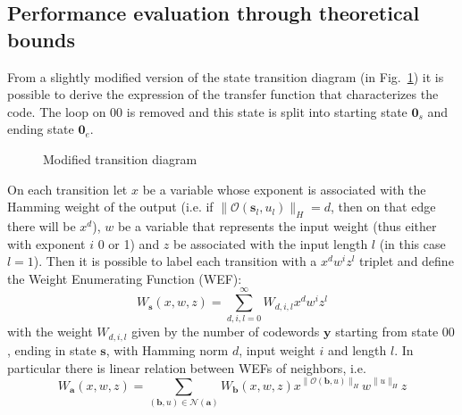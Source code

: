 \documentclass[10pt]{article}
\newcommand{\outf}[1] {\mathcal{O}(#1)}
\newcommand{\s} {\mathbf{s}}
\begin{document}
\subsection{Performance evaluation through theoretical bounds}

From a slightly modified version of the state transition diagram (in Fig.~\ref{fig:state_t}) it is possible to derive the expression of the transfer function that characterizes the code. The loop on $00$ is removed and this state is split into starting state $\mathbf{0}_s$ and ending state $\mathbf{0}_e$.

\begin{figure}
\centering
{}
\caption{Modified transition diagram}
\label{fig:state_t}
\end{figure}

On each transition let $x$ be a variable whose exponent is associated with the Hamming weight of the output (i.e. if $\|\outf{\s_l, u_l}\|_H = d$, then on that edge there will be $x^d$), $w$ be a variable that represents the input weight (thus either with exponent $i$ 0 or 1) and $z$ be associated with the input length $l$ (in this case $l=1$). Then it is possible to label each transition with a $x^dw^iz^l$ triplet and define the Weight Enumerating Function (WEF):
\begin{equation}
	W_{\mathbf{s}}(x, w, z) = \sum_{d, i, l = 0}^{\infty}W_{d, i, l} x^dw^iz^l
\end{equation}
with the weight $W_{d, i, l}$ given by the number of codewords $\mathbf{y}$ starting from state $00$, ending in state $\mathbf{s}$, with Hamming norm $d$, input weight $i$ and length $l$. In particular there is linear relation between WEFs of neighbors, i.e.
\begin{equation}
	W_{\mathbf{a}}(x, w, z) = \sum_{(\mathbf{b}, u) \in \mathcal{N}(\mathbf{a})
	} W_{\mathbf{b}}(x,w,z) x^{\|\outf{\mathbf{b}, u}\|_H} w^{\|u\|_H} z
\end{equation}
\end{document}
